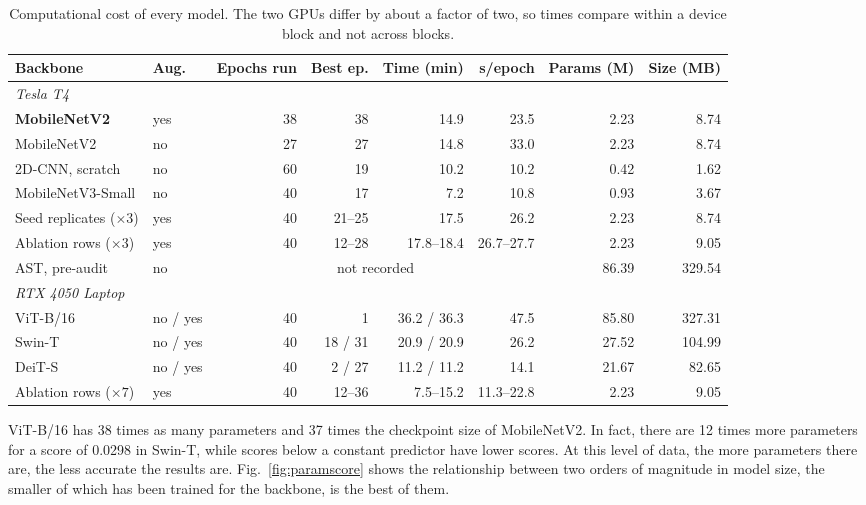 \documentclass[journal,onecolumn]{IEEEtran}
\newcommand{\best}[1]{\textbf{#1}}
\begin{document}
\begin{table}[hbtp]
\centering
\caption{Computational cost of every model. The two GPUs differ by about a factor of two, so times compare within a
device block and not across blocks.}
\label{tab:efficiency}
\footnotesize
\begin{tabular}{llrrrrrr}
\toprule
Backbone & Aug. & Epochs run & Best ep. & Time (min) & s/epoch & Params (M) & Size (MB) \\
\midrule
\multicolumn{8}{l}{\emph{Tesla T4}}\\
\best{MobileNetV2} & yes & 38 & 38 & \phantom{0}14.9 & 23.5 & \phantom{0}2.23 & \phantom{00}8.74 \\
MobileNetV2 & no & 27 & 27 & \phantom{0}14.8 & 33.0 & \phantom{0}2.23 & \phantom{00}8.74 \\
2D-CNN, scratch & no & 60 & 19 & \phantom{0}10.2 & 10.2 & \phantom{0}0.42 & \phantom{00}1.62 \\
MobileNetV3-Small & no & 40 & 17 & \phantom{00}7.2 & 10.8 & \phantom{0}0.93 & \phantom{00}3.67 \\
Seed replicates ($\times3$) & yes & 40 & 21--25 & \phantom{0}17.5 & 26.2 & \phantom{0}2.23 & \phantom{00}8.74 \\
Ablation rows ($\times3$) & yes & 40 & 12--28 & 17.8--18.4 & 26.7--27.7 & \phantom{0}2.23 & \phantom{00}9.05 \\
AST, pre-audit & no & \multicolumn{4}{c}{not recorded} & 86.39 & 329.54 \\
\midrule
\multicolumn{8}{l}{\emph{RTX 4050 Laptop}}\\
ViT-B/16 & no / yes & 40 & \phantom{0}1 & \phantom{0}36.2 / 36.3 & 47.5 & 85.80 & 327.31 \\
Swin-T   & no / yes & 40 & 18 / 31 & \phantom{0}20.9 / 20.9 & 26.2 & 27.52 & 104.99 \\
DeiT-S   & no / yes & 40 & \phantom{0}2 / 27 & \phantom{0}11.2 / 11.2 & 14.1 & 21.67 & \phantom{0}82.65 \\
Ablation rows ($\times7$) & yes & 40 & 12--36 & \phantom{0}7.5--15.2 & 11.3--22.8 & \phantom{0}2.23 & \phantom{00}9.05 \\
\bottomrule
\end{tabular}

\vspace{2pt}
\footnotesize 
\end{table}
ViT-B/16 has 38 times as many parameters and 37 times the checkpoint size of MobileNetV2. In fact, there are 12 times more parameters for a score of 0.0298 in Swin-T, while scores below a constant predictor have lower scores. At this level of data, the more parameters there are, the less accurate the results are. Fig.~\ref{fig:paramscore} shows the relationship between two orders of magnitude in model size, the smaller of which has been trained for the backbone, is the best of them.  
\end{document}
